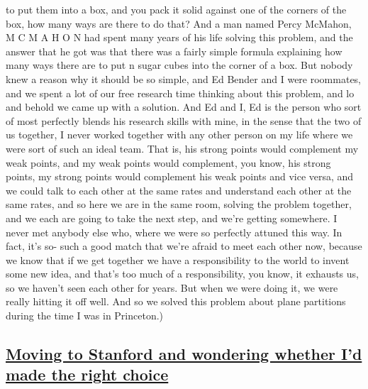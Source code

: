 \documentclass[]{article}
\begin{document}
to put them into a box, and you pack it solid against one of the corners
of the box, how many ways are there to do that? And a man named Percy
McMahon, M C M A H O N had spent many years of his life solving this
problem, and the answer that he got was that there was a fairly simple
formula explaining how many ways there are to put n sugar cubes into the
corner of a box. But nobody knew a reason why it should be so simple,
and Ed Bender and I were roommates, and we spent a lot of our free
research time thinking about this problem, and lo and behold we came up
with a solution. And Ed and I, Ed is the person who sort of most
perfectly blends his research skills with mine, in the sense that the
two of us together, I never worked together with any other person on my
life where we were sort of such an ideal team. That is, his strong
points would complement my weak points, and my weak points would
complement, you know, his strong points, my strong points would
complement his weak points and vice versa, and we could talk to each
other at the same rates and understand each other at the same rates, and
so here we are in the same room, solving the problem together, and we
each are going to take the next step, and we're getting somewhere. I
never met anybody else who, where we were so perfectly attuned this way.
In fact, it's so- such a good match that we're afraid to meet each other
now, because we know that if we get together we have a responsibility to
the world to invent some new idea, and that's too much of a
responsibility, you know, it exhausts us, so we haven't seen each other
for years. But when we were doing it, we were really hitting it off
well. And so we solved this problem about plane partitions during the
time I was in Princeton.)

\subsection{\texorpdfstring{\href{http://webofstories.com/play/17105}{Moving
to Stanford and wondering whether I'd made the right
choice}}{Moving to Stanford and wondering whether I'd made the right choice}}\label{moving-to-stanford-and-wondering-whether-id-made-the-right-choice}
\end{document}
